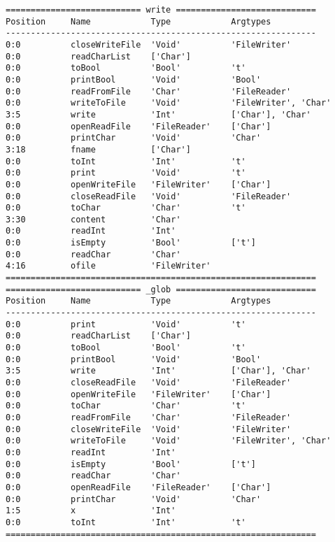 \documentclass[a4paper]{article}
\begin{document}
\begin{verbatim}
=========================== write ============================
Position     Name            Type            Argtypes            
--------------------------------------------------------------
0:0          closeWriteFile  'Void'          'FileWriter'        
0:0          readCharList    ['Char']                            
0:0          toBool          'Bool'          't'                 
0:0          printBool       'Void'          'Bool'              
0:0          readFromFile    'Char'          'FileReader'        
0:0          writeToFile     'Void'          'FileWriter', 'Char'
3:5          write           'Int'           ['Char'], 'Char'    
0:0          openReadFile    'FileReader'    ['Char']            
0:0          printChar       'Void'          'Char'              
3:18         fname           ['Char']                            
0:0          toInt           'Int'           't'                 
0:0          print           'Void'          't'                 
0:0          openWriteFile   'FileWriter'    ['Char']            
0:0          closeReadFile   'Void'          'FileReader'        
0:0          toChar          'Char'          't'                 
3:30         content         'Char'                              
0:0          readInt         'Int'                               
0:0          isEmpty         'Bool'          ['t']               
0:0          readChar        'Char'                              
4:16         ofile           'FileWriter'                        
==============================================================
=========================== _glob ============================
Position     Name            Type            Argtypes            
--------------------------------------------------------------
0:0          print           'Void'          't'                 
0:0          readCharList    ['Char']                            
0:0          toBool          'Bool'          't'                 
0:0          printBool       'Void'          'Bool'              
3:5          write           'Int'           ['Char'], 'Char'    
0:0          closeReadFile   'Void'          'FileReader'        
0:0          openWriteFile   'FileWriter'    ['Char']            
0:0          toChar          'Char'          't'                 
0:0          readFromFile    'Char'          'FileReader'        
0:0          closeWriteFile  'Void'          'FileWriter'        
0:0          writeToFile     'Void'          'FileWriter', 'Char'
0:0          readInt         'Int'                               
0:0          isEmpty         'Bool'          ['t']               
0:0          readChar        'Char'                              
0:0          openReadFile    'FileReader'    ['Char']            
0:0          printChar       'Void'          'Char'              
1:5          x               'Int'                               
0:0          toInt           'Int'           't'                 
==============================================================
\end{verbatim}
\end{document}
